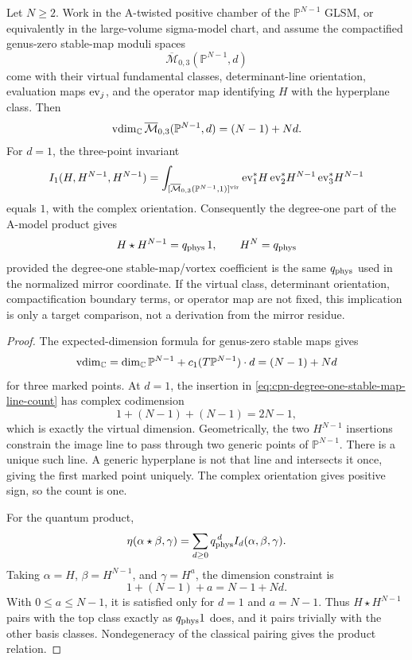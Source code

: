 \begin{proposition}
\label{prop:cpn-stable-map-quantum-product-gate}
Let \(N\ge2\).  Work in the A-twisted positive chamber of the
\(\mathbb P^{N-1}\) GLSM, or equivalently in the large-volume sigma-model
chart, and assume the compactified genus-zero stable-map moduli spaces
\[
  \overline{\mathcal M}_{0,3}(\mathbb P^{N-1},d)
\]
come with their virtual fundamental classes, determinant-line orientation,
evaluation maps \({\rm ev}_j\), and the operator map identifying \(H\) with
the hyperplane class.  Then
\[
  {\rm vdim}_{\mathbb C}\,
  \overline{\mathcal M}_{0,3}(\mathbb P^{N-1},d)
  =
  (N-1)+Nd .
\]
For \(d=1\), the three-point invariant
\begin{equation}
  I_1(H,H^{N-1},H^{N-1})
  =
  \int_{[\overline{\mathcal M}_{0,3}(\mathbb P^{N-1},1)]^{\rm vir}}
  {\rm ev}_1^\ast H\,
  {\rm ev}_2^\ast H^{N-1}\,
  {\rm ev}_3^\ast H^{N-1}
  \label{eq:cpn-degree-one-stable-map-line-count}
\end{equation}
equals \(1\), with the complex orientation.  Consequently the degree-one
part of the A-model product gives
\[
  H\star H^{N-1}=q_{\rm phys}\,1,
  \qquad
  H^N=q_{\rm phys}
\]
provided the degree-one stable-map/vortex coefficient is the same
\(q_{\rm phys}\) used in the normalized mirror coordinate.  If the virtual
class, determinant orientation, compactification boundary terms, or operator
map are not fixed, this implication is only a target comparison, not a
derivation from the mirror residue.
\end{proposition}

\begin{proof}
The expected-dimension formula for genus-zero stable maps gives
\[
  {\rm vdim}_{\mathbb C}
  =
  \dim_{\mathbb C}\mathbb P^{N-1}
  +c_1(T\mathbb P^{N-1})\cdot d
  =
  (N-1)+Nd
\]
for three marked points.  At \(d=1\), the insertion in
\eqref{eq:cpn-degree-one-stable-map-line-count} has complex codimension
\[
  1+(N-1)+(N-1)=2N-1,
\]
which is exactly the virtual dimension.  Geometrically, the two
\(H^{N-1}\) insertions constrain the image line to pass through two generic
points of \(\mathbb P^{N-1}\).  There is a unique such line.  A generic
hyperplane is not that line and intersects it once, giving the first marked
point uniquely.  The complex orientation gives positive sign, so the count is
one.

For the quantum product,
\[
  \eta(\alpha\star\beta,\gamma)
  =
  \sum_{d\ge0}q_{\rm phys}^{\,d} I_d(\alpha,\beta,\gamma).
  \]
Taking \(\alpha=H\), \(\beta=H^{N-1}\), and
\(\gamma=H^a\), the dimension constraint is
\[
  1+(N-1)+a=N-1+Nd .
\]
With \(0\le a\le N-1\), it is satisfied only for \(d=1\) and
\(a=N-1\).  Thus \(H\star H^{N-1}\) pairs with the top class exactly as
\(q_{\rm phys}1\) does, and it pairs trivially with the other basis classes.
Nondegeneracy of the classical pairing gives the product relation.
\end{proof}

